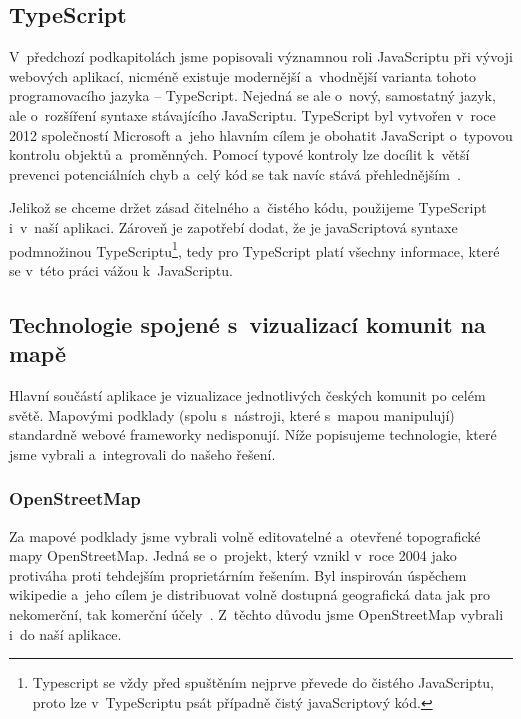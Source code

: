 \hypertarget{typescript}{%
\subsection{TypeScript}\label{typescript}}

V~předchozí podkapitolách jsme popisovali významnou roli JavaScriptu při vývoji webových aplikací, nicméně existuje modernější a~vhodnější varianta tohoto programovacího jazyka -- TypeScript. Nejedná se ale o~nový, samostatný jazyk, ale o~rozšíření syntaxe stávajícího JavaScriptu. TypeScript byl vytvořen v~roce 2012 společností Microsoft a~jeho hlavním cílem je obohatit JavaScript o~typovou kontrolu objektů a~proměnných. Pomocí typové kontroly lze docílit k~větší prevenci potenciálních chyb a~celý kód se tak navíc stává přehlednějším~\parencite{typescript}.

Jelikož se chceme držet zásad čitelného a~čistého kódu, použijeme TypeScript i~v~naší aplikaci. Zároveň je zapotřebí dodat, že je javaScriptová syntaxe podmnožinou TypeScriptu\footnote{Typescript se vždy před spuštěním nejprve převede do čistého JavaScriptu, proto lze v~TypeScriptu psát případně čistý javaScriptový kód.}, tedy pro TypeScript platí všechny informace, které se v~této práci vážou k~JavaScriptu.

\hypertarget{technologie-spojenuxe9-s-vizualizacuxed-komunit-na-mapux11b}{%
\subsection{Technologie spojené s~vizualizací komunit na mapě}\label{technologie-spojenuxe9-s-vizualizacuxed-komunit-na-mapux11b}}

Hlavní součástí aplikace je vizualizace jednotlivých českých komunit po celém světě. Mapovými podklady (spolu s~nástroji, které s~mapou manipulují) standardně webové frameworky nedisponují. Níže popisujeme technologie, které jsme vybrali a~integrovali do našeho řešení.

\hypertarget{openstreetmap}{%
\subsubsection{OpenStreetMap}\label{openstreetmap}}

Za mapové podklady jsme vybrali volně editovatelné a~otevřené topografické mapy OpenStreetMap. Jedná se o~projekt, který vznikl v~roce 2004 jako protiváha proti tehdejším proprietárním řešením. Byl inspirován úspěchem wikipedie a~jeho cílem je distribuovat volně dostupná geografická data jak pro nekomerční, tak komerční účely~\parencite{open-street}. Z~těchto důvodu jsme OpenStreetMap vybrali i~do naší aplikace.

